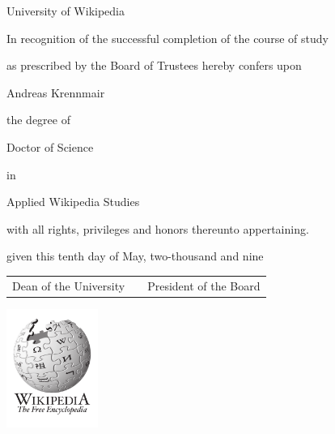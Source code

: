 \documentclass[a4paper,12pt,landscape]{article}
\newcommand{\HEADER}{\fontsize{80}{80}}
\newcommand{\HUGE}{\fontsize{50}{80}}
\begin{document}
\begin{center}
{\HEADER \pgothfamily University of Wikipedia}

{\LARGE \pgothfamily In recognition of the successful completion of the course of study}

{\LARGE \pgothfamily as prescribed by the Board of Trustees hereby confers upon}

{\HUGE \pgothfamily Andreas Krennmair}

{\LARGE \pgothfamily the degree of}

{\HUGE \pgothfamily Doctor of Science}

{\LARGE \pgothfamily in}

{\HUGE \pgothfamily Applied Wikipedia Studies}

{\LARGE \pgothfamily with all rights, privileges and honors thereunto appertaining.}

{\LARGE \pgothfamily given this tenth day of May, two-thousand and nine}

\end{center}

\vspace{1cm}
\begin{tabularx}{\textwidth}[b]{lXr} \cline{1-1} \cline{3-3}
{\large \pgothfamily Dean of the University} & & {\large \pgothfamily President of the Board}
\end{tabularx}

\begin{center}
\includegraphics[width=3cm,height=3.88cm]{wp-logo.pdf}
\end{center}
\end{document}
